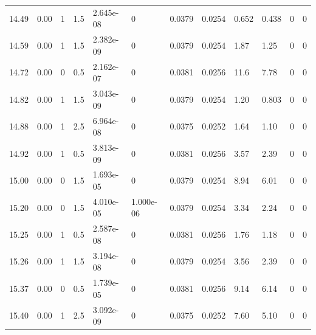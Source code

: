 \documentclass[preview]{standalone}
\begin{document}
{{{{{\begin{tabular}{L{1.2cm}C{1.2cm} C{0.3cm}C{0.5cm} C{1.4cm}C{1.4cm} C{1.4cm}C{1.4cm} C{1.6cm}C{1.6cm} C{1.6cm}C{1.6cm}}
  14.49  &  0.00  & 1     & 1.5 &  2.645e-08  & 0  &  0.0379&   0.0254& 0.652 & 0.438   &  0 & 0  \\ 
  14.59  &  0.00  & 1     & 1.5 &  2.382e-09  & 0  &  0.0379&   0.0254& 1.87 & 1.25   &  0 & 0  \\ 
  14.72  &  0.00  & 0     & 0.5 &  2.162e-07  & 0  &  0.0381&   0.0256& 11.6 & 7.78   &  0 & 0  \\ 
  14.82  &  0.00  & 1     & 1.5 &  3.043e-09  & 0  &  0.0379&   0.0254& 1.20 & 0.803   &  0 & 0  \\ 
  14.88  &  0.00  & 1     & 2.5 &  6.964e-08  & 0  &  0.0375&   0.0252& 1.64 & 1.10   &  0 & 0  \\ 
  14.92  &  0.00  & 1     & 0.5 &  3.813e-09  & 0  &  0.0381&   0.0256& 3.57 & 2.39   &  0 & 0  \\ 
  15.00  &  0.00  & 0     & 1.5 &  1.693e-05  & 0  &  0.0379&   0.0254& 8.94 & 6.01   &  0 & 0  \\ 
  15.20  &  0.00  & 0     & 1.5 &  4.010e-05  & 1.000e-06  &  0.0379&   0.0254& 3.34 & 2.24   &  0 & 0  \\ 
  15.25  &  0.00  & 1     & 0.5 &  2.587e-08  & 0  &  0.0381&   0.0256& 1.76 & 1.18   &  0 & 0  \\ 
  15.26  &  0.00  & 1     & 1.5 &  3.194e-08  & 0  &  0.0379&   0.0254& 3.56 & 2.39   &  0 & 0  \\ 
  15.37  &  0.00  & 0     & 0.5 &  1.739e-05  & 0  &  0.0381&   0.0256& 9.14 & 6.14   &  0 & 0  \\ 
  15.40  &  0.00  & 1     & 2.5 &  3.092e-09  & 0  &  0.0375&   0.0252& 7.60 & 5.10   &  0 & 0  \\ 
\hline 
\end{tabular} 

}}}}}
\end{document}

